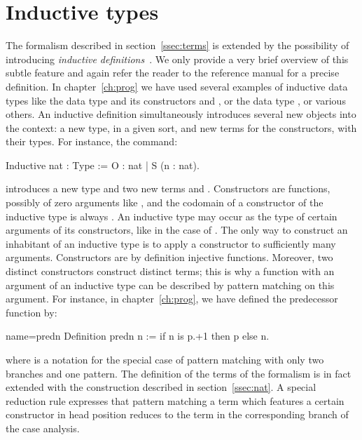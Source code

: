\section{Inductive types}\label{ssec:indtypes}

The formalism described in section~\ref{ssec:terms} is extended by
the possibility of introducing
\emph{inductive definitions}~\cite{CoPa89, Moh93}. We only provide a
very brief overview of this subtle feature and again refer the reader
to the reference manual for a precise definition.
In chapter~\ref{ch:prog} we have used several examples of inductive
data types like the data type  and its constructors  and
, or the data type , or various others.
An inductive definition simultaneously introduces
several new objects into the context: a new type, in a given sort, and
new terms for the constructors, with their types. For instance, the
command:

\begin{coq}{}{}
Inductive nat : Type := O : nat | S (n : nat).
\end{coq}
introduces a new type  and two new terms  and
. Constructors are functions, possibly of zero
arguments like , and the codomain of a constructor of the
inductive type  is always . An inductive type may occur as
the type of certain arguments of its constructors, like in the case of
. The only way to construct an inhabitant of an
inductive type is to apply a constructor to sufficiently many
arguments. Constructors are by definition injective functions.
Moreover, two distinct constructors construct distinct
terms; this is why a function with an argument of an inductive type can be
described by pattern matching on this argument. For instance, in
chapter~\ref{ch:prog}, we have defined the predecessor function by:

\begin{coq}{name=predn}{}
Definition predn n := if n is p.+1 then p else n.
\end{coq}
where  is a notation for the special case of
pattern matching with only two branches and one pattern. The definition of
the terms of the formalism is in fact extended with the
 construction described in
section~\ref{ssec:nat}. A special reduction rule expresses that
pattern matching a term which features a certain constructor in head
position reduces to the term in the corresponding branch of the case
analysis.

